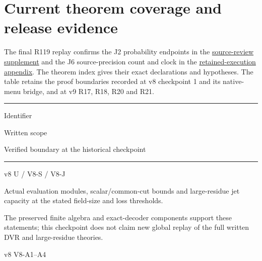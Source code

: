 \documentclass[11pt,a4paper]{article}
\newlength{\OfflineResearchTableWidth}
\newcommand{\OfflineResearchHeaderRule}{\noindent\rule{\linewidth}{0.45pt}\par}
\newcommand{\OfflineResearchRow}{\par}
\newenvironment{OfflineResearchTable}{%
  \par\medskip\begingroup\small\setlength{\parindent}{0pt}%
  \setlength{\parskip}{3pt plus 1pt minus .5pt}%
  \setlength{\OfflineResearchTableWidth}{\linewidth}%
}{%
  \par\endgroup\medskip%
}
\begin{document}
\section{Current theorem coverage and release evidence}\label{paper6-current-coverage}

The final R119 replay confirms the J2 probability endpoints in the
\hyperref[r47-v9-review-consequences]{source-review supplement} and the J6
source-precision count and clock in the
\hyperref[sec:retained-physical-execution]{retained-execution appendix}.
The theorem index gives their exact declarations and hypotheses.
The table retains the proof boundaries recorded at v8 checkpoint 1
and its native-menu bridge, and at v9 R17, R18, R20 and R21.

\begin{OfflineResearchTable}
\OfflineResearchHeaderRule
\noindent%
\begin{minipage}[t]{0.14074\OfflineResearchTableWidth}\raggedright
Identifier
\end{minipage}\hfill%
\begin{minipage}[t]{0.31165\OfflineResearchTableWidth}\raggedright
Written scope
\end{minipage}\hfill%
\begin{minipage}[t]{0.49261\OfflineResearchTableWidth}\raggedright
Verified boundary at the historical checkpoint
\end{minipage}%
\OfflineResearchRow
\nobreak
\OfflineResearchHeaderRule
\nobreak
\noindent%
\begin{minipage}[t]{0.14074\OfflineResearchTableWidth}\raggedright
v8 U / V8-S / V8-J
\end{minipage}\hfill%
\begin{minipage}[t]{0.31165\OfflineResearchTableWidth}\raggedright
Actual evaluation modules, scalar/common-cut bounds and large-residue jet capacity at the stated field-size and loss thresholds.
\end{minipage}\hfill%
\begin{minipage}[t]{0.49261\OfflineResearchTableWidth}\raggedright
The preserved finite algebra and exact-decoder components support these statements; this checkpoint does not claim new global replay of the full written DVR and large-residue theories.
\end{minipage}%
\OfflineResearchRow
\noindent%
\begin{minipage}[t]{0.14074\OfflineResearchTableWidth}\raggedright
v8 V8-A1--A4
\end{minipage}\hfill%
\begin{minipage}[t]{0.31165\OfflineResearchTableWidth}\raggedright

\end{minipage}
\end{OfflineResearchTable}
\end{document}
